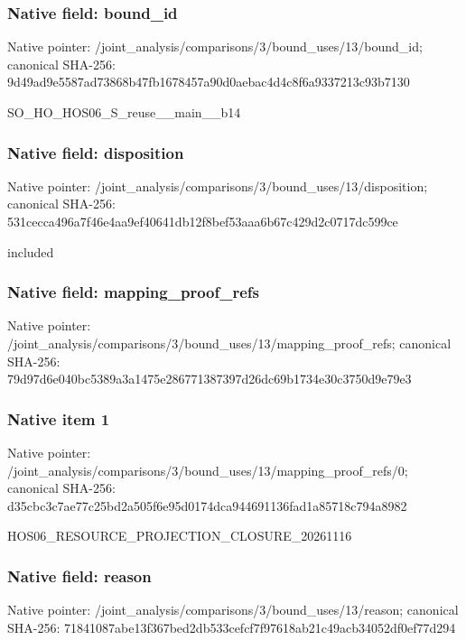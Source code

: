 \documentclass[10pt,a4paper]{article}
\begin{document}
\subsubsection{Native field: bound\_\allowbreak{}id}
Native pointer: /joint\_\allowbreak{}analysis/comparisons/3/bound\_\allowbreak{}uses/13/bound\_\allowbreak{}id; canonical SHA-256: 9d49ad9e5587ad73868b47fb1678457a90d0aebac4d4c8f6a9337213c93b7130

\begingroup\raggedright\sloppy SO\_\allowbreak{}HO\_\allowbreak{}HOS06\_\allowbreak{}S\_\allowbreak{}reuse\_\allowbreak{}\_\allowbreak{}main\_\allowbreak{}\_\allowbreak{}b14\par\endgroup

\subsubsection{Native field: disposition}
Native pointer: /joint\_\allowbreak{}analysis/comparisons/3/bound\_\allowbreak{}uses/13/disposition; canonical SHA-256: 531cecca496a7f46e4aa9ef40641db12f8bef53aaa6b67c429d2c0717dc599ce

\begingroup\raggedright\sloppy included\par\endgroup

\subsubsection{Native field: mapping\_\allowbreak{}proof\_\allowbreak{}refs}
Native pointer: /joint\_\allowbreak{}analysis/comparisons/3/bound\_\allowbreak{}uses/13/mapping\_\allowbreak{}proof\_\allowbreak{}refs; canonical SHA-256: 79d97d6e040bc5389a3a1475e286771387397d26dc69b1734e30c3750d9e79e3

\subsubsection{Native item 1}
Native pointer: /joint\_\allowbreak{}analysis/comparisons/3/bound\_\allowbreak{}uses/13/mapping\_\allowbreak{}proof\_\allowbreak{}refs/0; canonical SHA-256: d35cbc3c7ae77c25bd2a505f6e95d0174dca944691136fad1a85718c794a8982

\begingroup\raggedright\sloppy HOS06\_\allowbreak{}RESOURCE\_\allowbreak{}PROJECTION\_\allowbreak{}CLOSURE\_\allowbreak{}20261116\par\endgroup

\subsubsection{Native field: reason}
Native pointer: /joint\_\allowbreak{}analysis/comparisons/3/bound\_\allowbreak{}uses/13/reason; canonical SHA-256: 71841087abe13f367bed2db533cefcf7f97618ab21c49acb34052df0ef77d294
\end{document}
